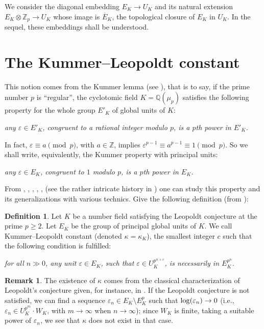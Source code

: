 \documentclass[12pt]{amsart}
\theoremstyle{definition}
\newtheorem{definition}[theorem]{Definition}
\newtheorem{remark}[theorem]{Remark}
\numberwithin{equation}{section}
\begin{document}
\smallskip
We consider the diagonal embedding $E_K \to U_K$ and its natural extension 
$E_K \otimes {\mathbb{Z}}_p \to U_K$ whose image is $\overline E_K$, the topological 
closure of $E_K$ in $U_K$. In the sequel, these embeddings shall be understood.

\section{The Kummer--Leopoldt constant}\label{section2}

This notion comes from the Kummer lemma (see \cite[Theorem 5.36]{W3}), that is to say,
if the prime number $p$ is ``regular'', the cyclotomic field $K={\mathbb{Q}}(\mu_p)$ 
satisfies the following property for the whole group $E'_K$ of global units of $K$: 

\smallskip
\centerline{\it any $\varepsilon \in E'_K$, congruent to a rational
integer modulo $p$, is a $p$th power in $E'_K$.}

\smallskip
In fact, $\varepsilon \equiv a \pmod p$, with $a \in {\mathbb{Z}}$, implies 
$\varepsilon^{p-1} \equiv a^{p-1} \equiv 1 \pmod p$. So we shall write, equivalently, the 
Kummer property with principal units:

\smallskip
\centerline{\it any $\varepsilon \in E_K$, congruent to $1$ modulo $p$, is a $p$th power in $E_K$.}

\medskip
From \cite{A}, \cite{L}, \cite{O}, \cite{S}, \cite{W1}, \cite{W2} 
(see the rather intricate history in \cite{AN}) one can study this property 
and its generalizations with various technics. 
Give the following definition (from \cite{AN}):

\begin{definition} \label{defkappa}
Let $K$ be a number field satisfying the Leopoldt conjecture at the prime
$p\geq 2$. Let $E_K$ be the group of principal global units of $K$.
We call Kummer--Leopoldt constant (denoted $\kappa = \kappa_K$), 
the smallest integer $c$ such that the following condition is fulfilled:

\smallskip
\centerline{\it for all $n \gg 0$, any unit $\varepsilon \in E_K$, such that 
$\varepsilon \in U_K^{p^{n+c}}$, is necessarily in $E_K^{p^n}$.}
\end{definition}

\begin{remark}\label{rema}
The existence of $\kappa$ comes from the classical characterization 
 of Leopoldt's conjecture given, for instance, in \cite[Theorem III.3.6.2 (iv)]{Gr1}.
If the Leopoldt conjecture is not satisfied, we can find a sequence
$\varepsilon_n \in E_K \setminus E_K^p$ such that ${\rm log} (\varepsilon_n)
\to 0$ (i.e., $\varepsilon_n \in U_K^{p^m} \!\cdot W_K$, with $m \to \infty$ 
when $n\to\infty$); since $W_K$ is finite, taking a suitable power of 
$\varepsilon_n$, we see that $\kappa$ does not exist in that case.
\end{remark}
\end{document}
